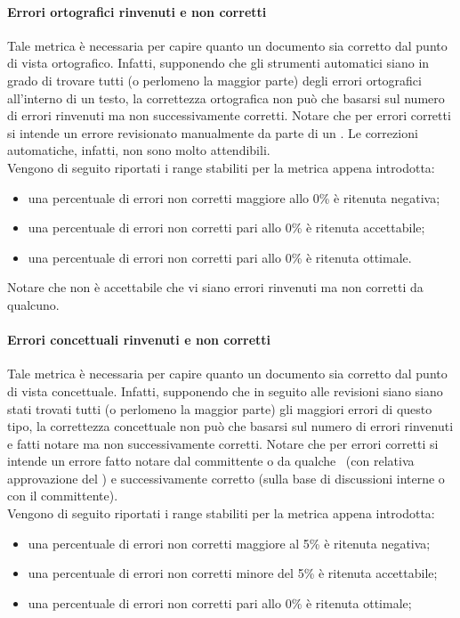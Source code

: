 \documentclass[../PianoDiQualifica.tex]{subfiles}
\begin{document}
				\paragraph{Errori ortografici rinvenuti e non corretti}
				Tale metrica è necessaria per capire quanto un documento sia corretto dal punto di vista ortografico. Infatti, supponendo che gli strumenti automatici siano in grado di trovare tutti (o perlomeno la maggior parte) degli errori ortografici all'interno di un testo, la correttezza ortografica non può che basarsi sul numero di errori rinvenuti ma non successivamente corretti. Notare che per errori corretti si intende un errore revisionato manualmente da parte di un \verificatore. Le correzioni automatiche, infatti, non sono molto attendibili. \\
				Vengono di seguito riportati i range stabiliti per la metrica appena introdotta:
				\begin{itemize}
					\item una percentuale di errori non corretti maggiore allo 0\% è ritenuta negativa;
					\item una percentuale di errori non corretti pari allo 0\% è ritenuta accettabile;
					\item una percentuale di errori non corretti pari allo 0\% è ritenuta ottimale.
				\end{itemize}
				Notare che non è accettabile che vi siano errori rinvenuti ma non corretti da qualcuno.
				\paragraph{Errori concettuali rinvenuti e non corretti}
				Tale metrica è necessaria per capire quanto un documento sia corretto dal punto di vista concettuale. Infatti, supponendo che in seguito alle revisioni siano siano stati trovati tutti (o perlomeno la maggior parte) gli maggiori errori di questo tipo, la correttezza concettuale non può che basarsi sul numero di errori rinvenuti e fatti notare ma non successivamente corretti. Notare che per errori corretti si intende un errore fatto notare dal committente o da qualche \verificatore\ (con relativa approvazione del \responsabilediprogetto) e successivamente corretto (sulla base di discussioni interne o con il committente).\\
				Vengono di seguito riportati i range stabiliti per la metrica appena introdotta:
				\begin{itemize}
					\item una percentuale di errori non corretti maggiore al 5\% è ritenuta negativa;
					\item una percentuale di errori non corretti minore del 5\% è ritenuta accettabile;
					\item una percentuale di errori non corretti pari allo 0\% è ritenuta ottimale;
				\end{itemize}	
\end{document}
